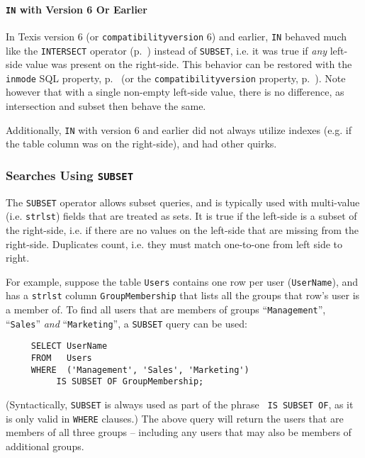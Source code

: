 \paragraph{{\tt IN} with Version 6 Or Earlier}
\label{InWithVersion6}

In Texis version 6 (or \verb`compatibilityversion` 6) and earlier,
\verb`IN` behaved much like the \verb`INTERSECT` operator
(p.~\pageref{IntersectOperator}) instead of \verb`SUBSET`, i.e. it was
true if {\em any} left-side value was present on the right-side.  This
behavior can be restored with the \verb`inmode` SQL property,
p.~\pageref{InmodeProperty} (or the \verb`compatibilityversion`
property, p.~\pageref{SqlPropertyCompatibilityVersion}).  Note however
that with a single non-empty left-side value, there is no difference,
as intersection and subset then behave the same.

Additionally, \verb`IN` with version 6 and earlier did not always
utilize indexes (e.g. if the table column was on the right-side), and
had other quirks.

\subsubsection{Searches Using {\tt SUBSET}}
\label{SubsetOperator}

  The {\tt SUBSET} operator allows subset queries, and is typically
used with multi-value (i.e. \verb`strlst`) fields that are treated as
sets.  It is true if the left-side is a subset of the right-side,
i.e. if there are no values on the left-side that are missing from the
right-side.  Duplicates count, i.e. they must match one-to-one from
left side to right.

  For example, suppose the table \verb`Users` contains one row per
user (\verb`UserName`), and has a \verb`strlst` column
\verb`GroupMembership` that lists all the groups that row's user is a
member of.  To find all users that are members of groups
``\verb`Management`'', ``\verb`Sales`'' {\em and}
``\verb`Marketing`'', a {\tt SUBSET} query can be used:

\begin{verbatim}
     SELECT UserName
     FROM   Users
     WHERE  ('Management', 'Sales', 'Marketing')
          IS SUBSET OF GroupMembership;
\end{verbatim}

(Syntactically, {\tt SUBSET} is always used as part of the phrase {\tt
IS SUBSET OF}, as it is only valid in {\tt WHERE} clauses.)  The above
query will return the users that are members of all three groups --
including any users that may also be members of additional groups.

